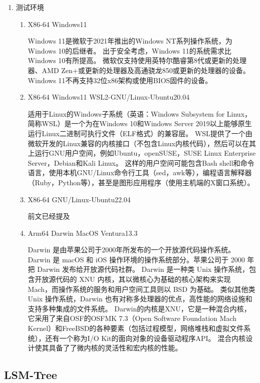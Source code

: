\begin{enumerate}[fullwidth,itemindent=2em,listparindent=2em]
\begin{enumerate}
			\end{enumerate}
		\item 测试环境
			\begin{enumerate}
				\item {X86-64 Windows11}
				
				Windows 11是微软于2021年推出的Windows NT系列操作系统，为Windows 10的后继者。
				出于安全考虑，Windows 11的系统需求比Windows 10有所提高。
				微软仅支持使用英特尔酷睿第8代或更新的处理器、AMD Zen+或更新的处理器及高通骁龙850或更新的处理器的设备。
				Windows 11不再支持32位x86架构或使用BIOS固件的设备。
				\item X86-64 Windows11 WSL2-GNU/Linux-Ubuntu20.04
				
				适用于Linux的Windows子系统（英语：Windows Subsystem for Linux，简称WSL）是一个为在Windows 10和Windows Server 2019以上能够原生运行Linux二进制可执行文件（ELF格式）的兼容层。
				WSL提供了一个由微软开发的Linux兼容的内核接口（不包含Linux内核代码），然后可以在其上运行GNU用户空间，例如Ubuntu，openSUSE，SUSE Linux Enterprise Server，Debian和Kali Linux。
				这样的用户空间可能包含Bash shell和命令语言，使用本机GNU/Linux命令行工具（sed，awk等），编程语言解释器（Ruby，Python等），甚至是图形应用程序（使用主机端的X窗口系统）。
				\item X86-64 GNU/Linux-Ubuntu22.04
				
				前文已经提及
				\item Arm64 Darwin MacOS Ventura13.3
				
				Darwin 是由苹果公司于2000年所发布的一个开放源代码操作系统。Darwin 是 macOS 和 iOS 操作环境的操作系统部分。苹果公司于 2000 年把 Darwin 发布给开放源代码社群。
				Darwin 是一种类 Unix 操作系统，包含开放源代码的 XNU 内核，其以微核心为基础的核心架构来实现 Mach，而操作系统的服务和用户空间工具则以 BSD 为基础。
				类似其他类 Unix 操作系统，Darwin 也有对称多处理器的优点，高性能的网络设施和支持多种集成的文件系统。
				Darwin的内核是XNU，它是一种混合内核，它采用了来自OSF的OSFMK 7.3（Open Software Foundation Mach Kernel）和FreeBSD的各种要素（包括过程模型，网络堆栈和虚拟文件系统），还有一个称为I/O Kit的面向对象的设备驱动程序API。
				混合内核设计使其具备了了微内核的灵活性和宏内核的性能。
			\end{enumerate}
  
  	\end{enumerate}
     
    \subsection{LSM-Tree}
    

